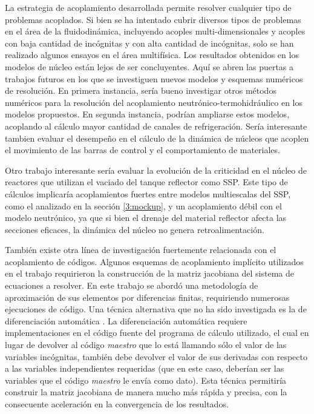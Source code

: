 La estrategia de acoplamiento desarrollada permite resolver cualquier tipo de problemas acoplados.
Si bien se ha intentado cubrir diversos tipos de problemas en el área de la fluidodinámica,
incluyendo acoples multi-dimensionales y acoples con baja cantidad de incógnitas y con alta cantidad de incógnitas,
solo se han realizado algunos ensayos en el área multifísica.
Los resultados obtenidos en los modelos de núcleo están lejos de ser concluyentes.
Aquí se abren las puertas a trabajos futuros en los que se investiguen nuevos modelos y esquemas numéricos de resolución.
En primera instancia, sería bueno investigar otros métodos numéricos para la resolución del acoplamiento neutrónico-termohidráulico en los modelos propuestos.
En segunda instancia, podrían ampliarse estos modelos, acoplando al cálculo mayor cantidad de canales de refrigeración.
Sería interesante tambien evaluar el desempeño en el cálculo de la dinámica de núcleos que acoplen el movimiento de las barras de control y el comportamiento de materiales.

Otro trabajo interesante sería evaluar la evolución de la criticidad en el núcleo de reactores que utilizan el vaciado del tanque reflector como SSP.
Este tipo de cálculos implicaría acoplamientos fuertes entre modelos multiescalas del SSP, como el analizado en la sección \ref{3:mockup},
y un acoplamiento débil con el modelo neutrónico, ya que si bien el drenaje del material reflector afecta las secciones eficaces,
la dinámica del núcleo no genera retroalimentación.

También existe otra línea de investigación fuertemente relacionada con el acoplamiento de códigos.
Algunos esquemas de acoplamiento implícito utilizados en el trabajo requirieron la construcción de la matriz jacobiana del sistema de ecuaciones a resolver.
En este trabajo se abordó una metodología de aproximación de sus elementos por diferencias finitas, requiriendo numerosas ejecuciones de código.
Una técnica alternativa que no ha sido investigada es la de diferenciación automática \cite{griewank-ad}.
La diferenciación automática requiere implementaciones en el código fuente del programa de cálculo utilizado,
el cual en lugar de devolver al código \textit{maestro} que lo está llamando sólo el valor de las variables incógnitas,
también debe devolver el valor de sus derivadas con respecto a las variables independientes requeridas
(que en este caso, deberían ser las variables que el código \textit{maestro} le envía como dato).
Esta técnica permitiría construir la matriz jacobiana de manera mucho más rápida y precisa,
con la consecuente aceleración en la convergencia de los resultados.
